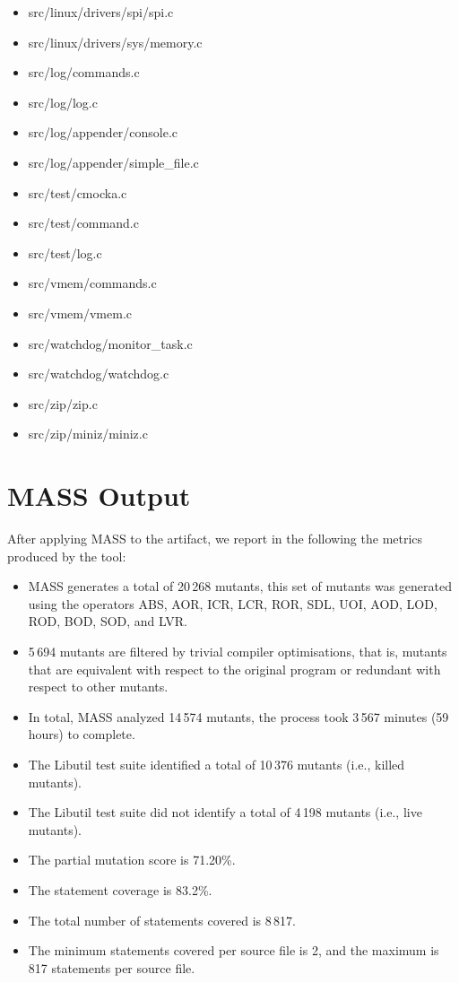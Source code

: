 \begin{itemize}
	\item src/linux/drivers/spi/spi.c
	\item src/linux/drivers/sys/memory.c
	\item src/log/commands.c
	\item src/log/log.c
	\item src/log/appender/console.c
	\item src/log/appender/simple\_file.c
	\item src/test/cmocka.c
	\item src/test/command.c
	\item src/test/log.c
	\item src/vmem/commands.c
	\item src/vmem/vmem.c
	\item src/watchdog/monitor\_task.c
	\item src/watchdog/watchdog.c
	\item src/zip/zip.c
	\item src/zip/miniz/miniz.c
\end{itemize}


\section{MASS Output}

After applying MASS to the artifact, we report in the following the metrics produced by the tool:

\begin{itemize}
	\item MASS generates a total of 20\,268 mutants, this set of mutants was generated using the operators ABS, AOR, ICR, LCR, ROR, SDL, UOI, AOD, LOD, ROD, BOD, SOD, and LVR.

	\item 5\,694 mutants are filtered by trivial compiler optimisations, that is, mutants that are equivalent with respect to the original program or redundant with respect to other mutants.

	\item In total, MASS analyzed 14\,574 mutants, the process took 3\,567 minutes (59 hours) to complete.

	\item The Libutil test suite identified a total of 10\,376 mutants (i.e., killed mutants).

	\item The Libutil test suite did not identify a total of 4\,198 mutants (i.e., live mutants).

	\item The partial mutation score is 71.20\%.

	\item The statement coverage is 83.2\%.
	
	\item The total number of statements covered is 8\,817.
	
	\item The minimum statements covered per source file is 2, and the maximum is 817 statements per source file.
\end{itemize}

